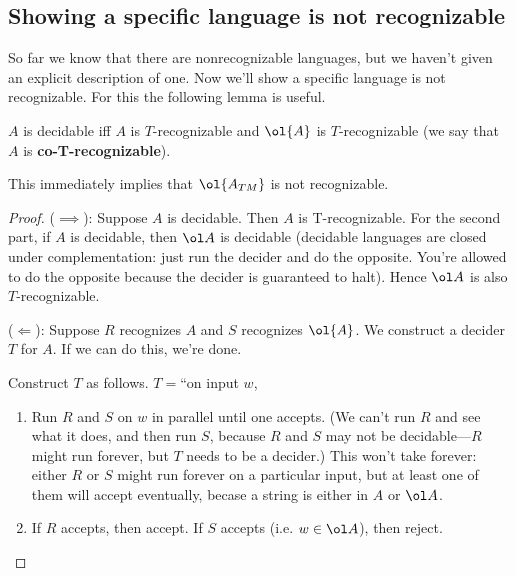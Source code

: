 \subsection{Showing a specific language is not recognizable}
So far we know that there are nonrecognizable languages, but we haven't given an explicit description of one.
Now we'll show a specific language is not recognizable. For this the following lemma is useful.
\begin{lem}
$A$ is decidable iff $A$ is $T$-recognizable and $\ol{A}$ is $T$-recognizable (we say that $A$ is \textbf{co-T-recognizable}).
\end{lem}
This immediately implies that $\ol{A_{TM}}$ is not recognizable.
\begin{proof}
($\implies$): Suppose $A$ is decidable. Then $A$ is T-recognizable. For the second part, if $A$ is decidable, then $\ol A$ is decidable (decidable languages are closed under complementation: just run the decider and do the opposite. You're allowed to do the opposite because the decider is guaranteed to halt). Hence $\ol A$ is also $T$-recognizable.

($\Leftarrow$): Suppose $R$ recognizes $A$ and $S$ recognizes $\ol{A}$. We construct a decider $T$ for $A$. If we can do this, we're done.

Construct $T$ as follows. $T=$``on input $w$, 
\begin{enumerate}
\item
Run $R$ and $S$ on $w$ in parallel until one accepts. (We can't run $R$ and see what it does, and then run $S$, because $R$ and $S$ may not be decidable---$R$ might run forever, but $T$ needs to be a decider.) This won't take forever: either $R$ or $S$ might run forever on a particular input, but at least one of them will accept eventually, becase a string is either in $A$ or $\ol A$.
\item
If $R$ accepts, then accept. If $S$ accepts (i.e. $w\in \ol A$), then reject.
\end{enumerate}
\end{proof}
